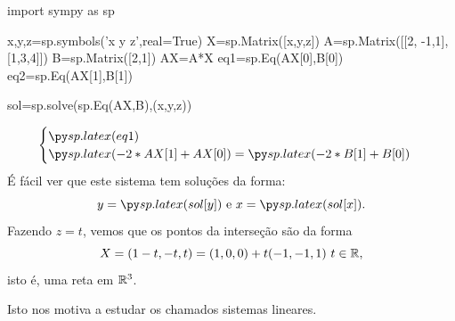 \begin{frame}[label=sistemas,fragile=singleslide]

\begin{pycode}
import sympy as sp

x,y,z=sp.symbols('x y z',real=True)
X=sp.Matrix([x,y,z])
A=sp.Matrix([[2, -1,1],[1,3,4]])
B=sp.Matrix([2,1])
AX=A*X
eq1=sp.Eq(AX[0],B[0])
eq2=sp.Eq(AX[1],B[1])

sol=sp.solve(sp.Eq(AX,B),(x,y,z))

\end{pycode}

\[\begin{cases}
\pyl{eq1}\\
\pyl{-2*AX[1]+AX[0]}=\pyl{-2*B[1]+B[0]}
\end{cases}\]
É fácil ver que este sistema tem soluções da forma:
\[y=\pyl{sol[y]} \text{ e } x=\pyl{sol[x]}.\]
Fazendo $z=t$, vemos que os pontos da interseção são da forma
\[X=(1-t,-t,t)=(1,0,0)+t(-1,-1,1)\ t \in \mathbb{R},\]
isto é, uma reta em $\mathbb{R}^3$. 
\medskip

Isto nos motiva a estudar os chamados {\color{blue}sistemas lineares}.

\end{frame}










